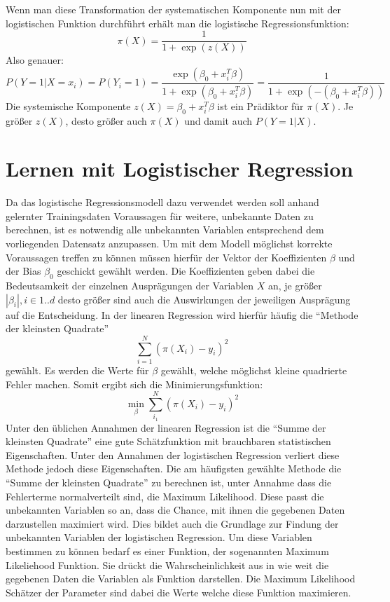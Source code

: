 \newpage
Wenn man diese Transformation der systematischen Komponente nun mit der logistischen Funktion durchführt erhält man die logistische Regressionsfunktion:
\begin{displaymath}
\pi(X)= \dfrac{1}{1+\exp(z(X))}
\end{displaymath}
Also genauer:
\begin{displaymath}
P(Y=1 | X=x_i)=P(Y_i=1)=\frac{\exp(\beta_0+x_i^T\beta)}{1+\exp(\beta_0+x_i^T\beta)} = \frac{1}{1+\exp(-(\beta_0+x_i^T\beta))}
\end{displaymath}
Die systemische Komponente $z(X)=\beta_0 + x_i^T\beta$ ist ein Prädiktor für $\pi(X)$. Je größer $z(X)$, desto größer auch $\pi(X)$ und damit auch $P(Y=1|X)$.\cite{BECK} 
\section{Lernen mit Logistischer Regression}
Da das logistische Regressionsmodell dazu verwendet werden soll anhand gelernter Trainingsdaten Voraussagen für weitere, unbekannte Daten zu berechnen, ist es notwendig alle unbekannten Variablen entsprechend dem vorliegenden Datensatz anzupassen.
Um mit dem Modell möglichst korrekte Voraussagen treffen zu können müssen hierfür der Vektor der Koeffizienten $\beta$ und der Bias $\beta_0$ geschickt gewählt werden. Die Koeffizienten geben dabei die Bedeutsamkeit der einzelnen Ausprägungen der Variablen $X$ an, je größer $|\beta_i|, i \in 1..d$ desto größer sind auch die Auswirkungen der jeweiligen Ausprägung auf die Entscheidung.\cite{FS}
In der linearen Regression wird hierfür häufig die "`Methode der kleinsten Quadrate"' 
\begin{displaymath}
\sum_{i=1}^N(\pi(X_i)-y_i)^2
\end{displaymath}
gewählt. Es werden die Werte für $\beta$ gewählt, welche möglichst kleine quadrierte Fehler machen. Somit ergibt sich die Minimierungsfunktion: 
\begin{displaymath}
\min_\beta \sum_{i_1}^N (\pi(X_i)-y_i)^2
\end{displaymath}
Unter den üblichen Annahmen der linearen Regression ist die "`Summe der kleinsten Quadrate"' eine gute Schätzfunktion mit brauchbaren statistischen Eigenschaften.\cite{WIL}
Unter den Annahmen der logistischen Regression verliert diese Methode jedoch diese Eigenschaften. Die am häufigsten gewählte Methode die "`Summe der kleinsten Quadrate"' zu berechnen ist, unter Annahme dass die Fehlerterme normalverteilt sind, die Maximum Likelihood. Diese passt die unbekannten Variablen so an, dass die Chance, mit ihnen die gegebenen Daten darzustellen maximiert wird. Dies bildet auch die Grundlage zur Findung der unbekannten Variablen der logistischen Regression. Um diese Variablen bestimmen zu können bedarf es einer Funktion, der sogenannten Maximum Likeliehood Funktion. Sie drückt die Wahrscheinlichkeit aus in wie weit die gegebenen Daten die Variablen als Funktion darstellen. Die Maximum Likelihood Schätzer der Parameter sind dabei die Werte welche diese Funktion maximieren.\cite{WIL}

